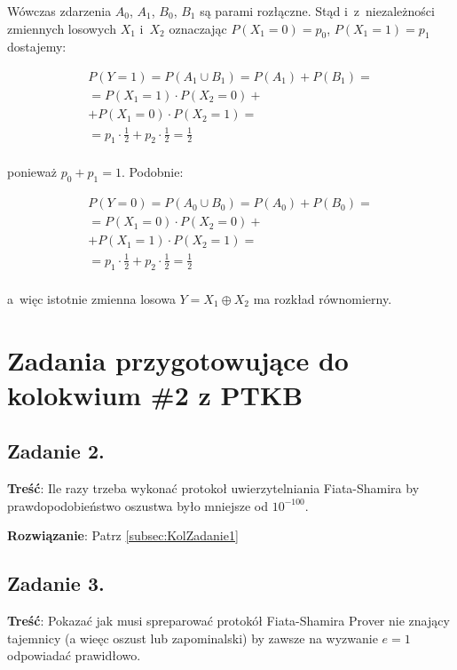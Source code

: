 \documentclass[a4paper,10pt, twocolumn]{article}
\begin{document}
\noindent Wówczas zdarzenia $A_{0}$, $A_{1}$, $B_{0}$, $B_{1}$ są parami rozłączne. Stąd i~z~niezależności zmiennych losowych $X_{1}$ i~$X_{2}$ oznaczając $P(X_{1} = 0) = p_{0}$, $P(X_{1} = 1) = p_{1}$ dostajemy:

\begin{equation*}
	\begin{array}{c} P(Y = 1) = P(A_{1} \cup B_{1}) = P(A_{1}) + P(B_{1}) = \\ = P(X_{1} = 1) \cdot P(X_{2} = 0) + \\ + P(X_{1} = 0) \cdot P(X_{2} = 1) = \\ = p_{1} \cdot \frac{1}{2} + p_{2} \cdot \frac{1}{2} = \frac{1}{2} \\ \end{array}
\end{equation*}

\noindent ponieważ $p_{0} + p_{1} = 1$. Podobnie:

\begin{equation*}
	\begin{array}{c} P(Y = 0) = P(A_{0} \cup B_{0}) = P(A_{0}) + P(B_{0}) = \\ = P(X_{1} = 0) \cdot P(X_{2} = 0) + \\ + P(X_{1} = 1) \cdot P(X_{2} = 1) = \\ = p_{1} \cdot \frac{1}{2} + p_{2} \cdot \frac{1}{2} = \frac{1}{2} \\ \end{array}
\end{equation*}

\noindent a~więc istotnie zmienna losowa $Y = X_{1} \oplus X_{2}$ ma rozkład równomierny.

\section{Zadania przygotowujące do kolokwium \#2 z PTKB}

\subsection{Zadanie 2.}
\textbf{Treść}: Ile razy trzeba wykonać protokoł uwierzytelniania Fiata-Shamira by prawdopodobieństwo oszustwa było mniejsze od $10^{-100}$.

\textbf{Rozwiązanie}: Patrz \ref{subsec:KolZadanie1}

\subsection{Zadanie 3.}
\textbf{Treść}: Pokazać jak musi spreparować protokół Fiata-Shamira Prover nie znający tajemnicy (a wieęc oszust lub zapominalski) by zawsze na wyzwanie $e=1$ odpowiadać prawidłowo.
\end{document}
